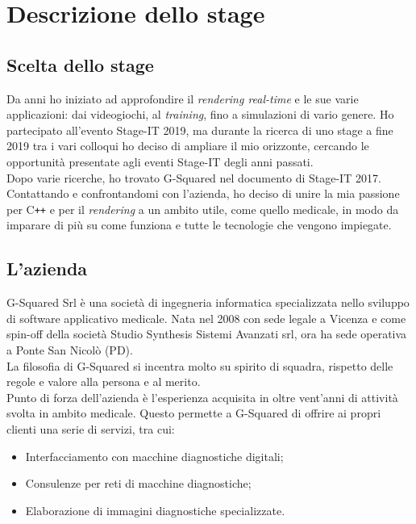
\chapter{Descrizione dello stage}
\label{cap:descrizione-stage}
\section{Scelta dello stage}\label{sec:scelta-dello-stage}
Da anni ho iniziato ad approfondire il \emph{rendering real-time} e le sue varie applicazioni: dai videogiochi, al \emph{training}, fino a simulazioni di vario genere.
Ho partecipato all'evento Stage-IT 2019, ma durante la ricerca di uno stage a fine 2019 tra i vari colloqui ho deciso di ampliare il mio orizzonte, cercando le opportunità presentate agli eventi Stage-IT degli anni passati.
\\
Dopo varie ricerche, ho trovato G-Squared nel documento di Stage-IT 2017. Contattando e confrontandomi con l'azienda, ho deciso di unire la mia passione per C\texttt{++} e per il \emph{rendering} a un ambito utile, come quello medicale, in modo da imparare di più su come funziona e tutte le tecnologie che vengono impiegate.

\section{L'azienda}
\label{azienda}
G-Squared Srl è una società di ingegneria informatica specializzata nello sviluppo di software applicativo medicale. Nata nel 2008 con sede legale a Vicenza e come spin-off della società Studio Synthesis Sistemi Avanzati srl, ora ha sede operativa a Ponte San Nicolò (PD).
\\
La filosofia di G-Squared si incentra molto su spirito di squadra, rispetto delle regole e valore alla persona e al merito.
\\
Punto di forza dell'azienda è l'esperienza acquisita in oltre vent'anni di attività svolta in ambito medicale. Questo permette a G-Squared di offrire ai propri clienti una serie di servizi, tra cui:
\begin{itemize}
	\item Interfacciamento con macchine diagnostiche digitali;
	\item Consulenze per reti di macchine diagnostiche;
	\item Elaborazione di immagini diagnostiche specializzate.
\end{itemize}

